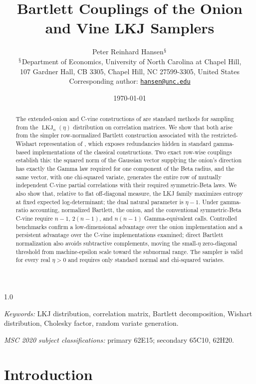 \documentclass[12pt,english]{article}
\title{Bartlett Couplings of the Onion and Vine LKJ Samplers}
\author{Peter Reinhard Hansen$^{\mathsection}$
\\[0.1cm] \small $^{\mathsection}$Department of Economics, University of North Carolina at Chapel Hill,
\\ \small 107 Gardner Hall, CB 3305, Chapel Hill, NC 27599-3305, United States
\\[0.1cm] \small Corresponding author: \href{mailto:hansen@unc.edu}{\texttt{hansen@unc.edu}}}
\date{\small \today\vspace{-10mm}}
\theoremstyle{plain} %
\theoremstyle{definition} %
\theoremstyle{remark} %
\begin{document}
\maketitle

\begin{spacing}{1.0}
\begin{abstract}
The extended-onion and C-vine constructions of \citet{LewandowskiKurowickaJoe:2009} are standard methods for sampling from the $\operatorname{LKJ}_n(\eta)$ distribution on correlation matrices. We show that both arise from the simpler row-normalized Bartlett construction associated with the restricted-Wishart representation of \citet{WangWuChu:2018}, which exposes redundancies hidden in standard gamma-based implementations of the classical constructions. Two exact row-wise couplings establish this: the squared norm of the Gaussian vector supplying the onion's direction has exactly the Gamma law required for one component of the Beta radius, and the same vector, with one chi-squared variate, generates the entire row of mutually independent C-vine partial correlations with their required symmetric-Beta laws. We also show that, relative to flat off-diagonal measure, the LKJ family maximizes entropy at fixed expected log-determinant; the dual natural parameter is $\eta-1$. Under gamma-ratio accounting, normalized Bartlett, the onion, and the conventional symmetric-Beta C-vine require $n-1$, $2(n-1)$, and $n(n-1)$ Gamma-equivalent calls. Controlled benchmarks confirm a low-dimensional advantage over the onion implementation and a persistent advantage over the C-vine implementations examined; direct Bartlett normalization also avoids subtractive complements, moving the small-$\eta$ zero-diagonal threshold from machine-epsilon scale toward the subnormal range. The sampler is valid for every real $\eta>0$ and requires only standard normal and chi-squared variates.
\end{abstract}

{\small\textit{{\noindent}Keywords:}}{\small{} LKJ distribution, correlation matrix, Bartlett decomposition, Wishart distribution, Cholesky factor, random variate generation.}{\small\par}

{\small\textit{{\noindent}MSC 2020 subject classifications:}}{\small{} primary 62E15; secondary 65C10, 62H20.}{\small\par}
\end{spacing}

\newpage

\section{Introduction}
\label{sec:introduction}
\end{document}
